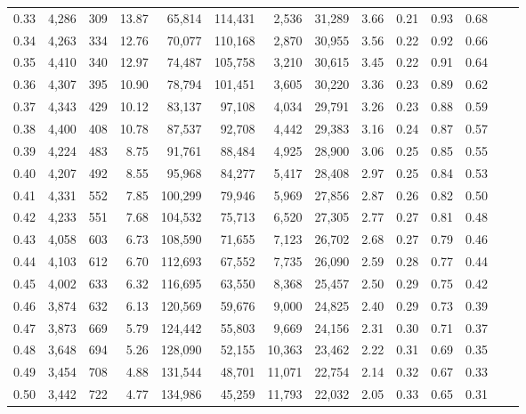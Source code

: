 \begin{tabular}{rrrrrrrrrrrrrr}
0.33 &  4,286 &  309 &   13.87 &   65,814 &  114,431 &   2,536 &  31,289 &  3.66 &  0.21 &  0.93 &      0.68 \\
0.34 &  4,263 &  334 &   12.76 &   70,077 &  110,168 &   2,870 &  30,955 &  3.56 &  0.22 &  0.92 &      0.66 \\
0.35 &  4,410 &  340 &   12.97 &   74,487 &  105,758 &   3,210 &  30,615 &  3.45 &  0.22 &  0.91 &      0.64 \\
0.36 &  4,307 &  395 &   10.90 &   78,794 &  101,451 &   3,605 &  30,220 &  3.36 &  0.23 &  0.89 &      0.62 \\
0.37 &  4,343 &  429 &   10.12 &   83,137 &   97,108 &   4,034 &  29,791 &  3.26 &  0.23 &  0.88 &      0.59 \\
0.38 &  4,400 &  408 &   10.78 &   87,537 &   92,708 &   4,442 &  29,383 &  3.16 &  0.24 &  0.87 &      0.57 \\
0.39 &  4,224 &  483 &    8.75 &   91,761 &   88,484 &   4,925 &  28,900 &  3.06 &  0.25 &  0.85 &      0.55 \\
0.40 &  4,207 &  492 &    8.55 &   95,968 &   84,277 &   5,417 &  28,408 &  2.97 &  0.25 &  0.84 &      0.53 \\
0.41 &  4,331 &  552 &    7.85 &  100,299 &   79,946 &   5,969 &  27,856 &  2.87 &  0.26 &  0.82 &      0.50 \\
0.42 &  4,233 &  551 &    7.68 &  104,532 &   75,713 &   6,520 &  27,305 &  2.77 &  0.27 &  0.81 &      0.48 \\
0.43 &  4,058 &  603 &    6.73 &  108,590 &   71,655 &   7,123 &  26,702 &  2.68 &  0.27 &  0.79 &      0.46 \\
0.44 &  4,103 &  612 &    6.70 &  112,693 &   67,552 &   7,735 &  26,090 &  2.59 &  0.28 &  0.77 &      0.44 \\
0.45 &  4,002 &  633 &    6.32 &  116,695 &   63,550 &   8,368 &  25,457 &  2.50 &  0.29 &  0.75 &      0.42 \\
0.46 &  3,874 &  632 &    6.13 &  120,569 &   59,676 &   9,000 &  24,825 &  2.40 &  0.29 &  0.73 &      0.39 \\
0.47 &  3,873 &  669 &    5.79 &  124,442 &   55,803 &   9,669 &  24,156 &  2.31 &  0.30 &  0.71 &      0.37 \\
0.48 &  3,648 &  694 &    5.26 &  128,090 &   52,155 &  10,363 &  23,462 &  2.22 &  0.31 &  0.69 &      0.35 \\
0.49 &  3,454 &  708 &    4.88 &  131,544 &   48,701 &  11,071 &  22,754 &  2.14 &  0.32 &  0.67 &      0.33 \\
0.50 &  3,442 &  722 &    4.77 &  134,986 &   45,259 &  11,793 &  22,032 &  2.05 &  0.33 &  0.65 &      0.31 \\

\end{tabular}
